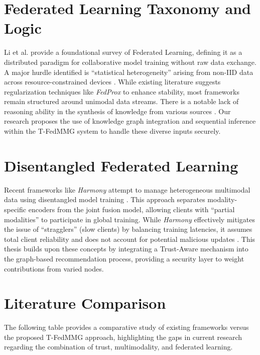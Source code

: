 \documentclass[12pt,a4paper]{report}
\begin{document}
{\section{Federated Learning Taxonomy and Logic}
Li et al. \cite{b5} provide a foundational survey of Federated Learning, defining it as a distributed paradigm for collaborative model training without raw data exchange. A major hurdle identified is ``statistical heterogeneity'' arising from non-IID data across resource-constrained devices \cite{b5}. While existing literature suggests regularization techniques like \textit{FedProx} to enhance stability, most frameworks remain structured around unimodal data streams. There is a notable lack of reasoning ability in the synthesis of knowledge from various sources \cite{b5}. Our research proposes the use of knowledge graph integration and sequential inference within the T-FedMMG system to handle these diverse inputs securely.

\section{Disentangled Federated Learning}
Recent frameworks like \textit{Harmony} attempt to manage heterogeneous multimodal data using disentangled model training \cite{b6}. This approach separates modality-specific encoders from the joint fusion model, allowing clients with ``partial modalities'' to participate in global training. While \textit{Harmony} effectively mitigates the issue of ``stragglers'' (slow clients) by balancing training latencies, it assumes total client reliability and does not account for potential malicious updates \cite{b6}. This thesis builds upon these concepts by integrating a Trust-Aware mechanism into the graph-based recommendation process, providing a security layer to weight contributions from varied nodes.

\section{Literature Comparison}

The following table provides a comparative study of existing frameworks versus the proposed T-FedMMG approach, highlighting the gaps in current research regarding the combination of trust, multimodality, and federated learning.

}
\end{document}
